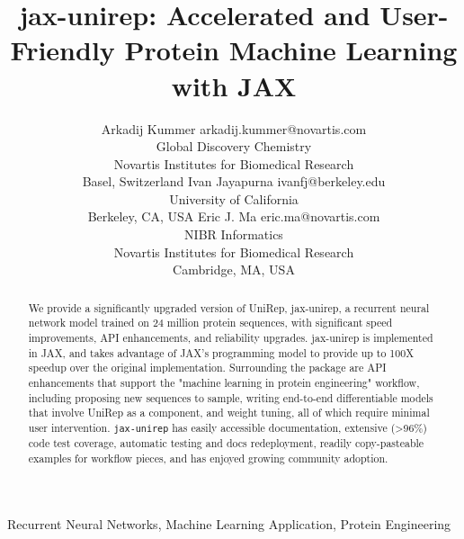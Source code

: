 \documentclass[twoside,11pt]{article}
\begin{document}
\title{jax-unirep: Accelerated and User-Friendly Protein Machine Learning with JAX}

\author{\name Arkadij Kummer \email arkadij.kummer@novartis.com \\
       \addr Global Discovery Chemistry\\
       Novartis Institutes for Biomedical Research\\
       Basel, Switzerland
       \AND
       \name Ivan Jayapurna \email ivanfj@berkeley.edu \\
       \addr University of California\\
       Berkeley, CA, USA
       \AND
       \name Eric J. Ma \email eric.ma@novartis.com \\
       \addr NIBR Informatics\\
       Novartis Institutes for Biomedical Research\\
       Cambridge, MA, USA
       }


\maketitle

\begin{abstract}%
We provide a significantly upgraded version of UniRep, jax-unirep,
a recurrent neural network model trained on 24 million protein sequences,
with significant speed improvements,
API enhancements,
and reliability upgrades.
jax-unirep is implemented in JAX,
and takes advantage of JAX's programming model
to provide up to 100X speedup over the original implementation.
Surrounding the package are API enhancements
that support the "machine learning in protein engineering" workflow,
including proposing new sequences to sample,
writing end-to-end differentiable models that involve UniRep as a component,
and weight tuning,
all of which require minimal user intervention.
\verb|jax-unirep| has easily accessible documentation,
extensive (>96\%) code test coverage,
automatic testing and docs redeployment,
readily copy-pasteable examples for workflow pieces,
and has enjoyed growing community adoption.
\end{abstract}

\begin{keywords}
  Recurrent Neural Networks, Machine Learning Application, Protein Engineering
\end{keywords}
\end{document}
